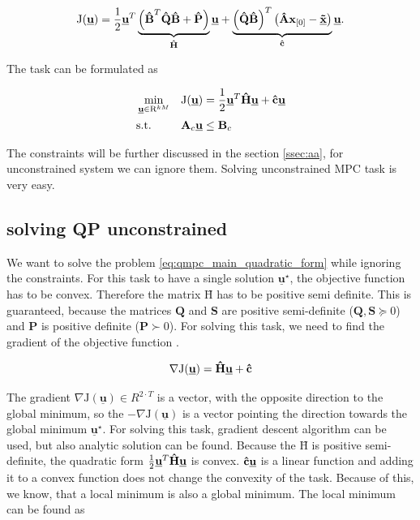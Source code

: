 \documentclass{article}
\newcommand{\uvec}{\textbf{\underline{u}}}
\newcommand{\macJ}{\mathrm{J}(\uvec)}
\begin{document}
\begin{equation}
\mathrm{J}(\underline{\textbf{u}}) = \frac{1}{2}\uvec^T\underbrace{\left(\textbf{\^B}^T\textbf{\^Q}\textbf{\^B} + \textbf{\^P}\right)}_{\textbf{\^H}}\uvec + \underbrace{\left(\textbf{\^Q}\textbf{\^B}\right)^T\left(\textbf{\^A}\textbf{x}_{[0]} - \textbf{\underline{\~x}}\right)}_{\textbf{\^c}}\uvec.
\label{eq:mpc_objective_large}
\end{equation}

The task can be formulated as

\begin{equation}
\label{eq:qmpc_main_quadratic_form}
\begin{aligned}
& \min_{\uvec \in \mathrm{R}^{kM}}
& & \mathrm{J}(\uvec) = \frac{1}{2}\uvec^T\textbf{\^H}\uvec + \textbf{\^c} \uvec\\
& \text{s.t.}
& & \textbf{A}_c \uvec \leq \textbf{B}_c
\end{aligned}
\end{equation}

The constraints will be further discussed in the section \ref{ssec:aa}, for unconstrained system we can ignore them. Solving unconstrained MPC task is very easy.

\subsection{solving QP unconstrained}
We want to solve the problem \ref{eq:qmpc_main_quadratic_form} while ignoring the constraints. For this task to have a single solution $\underline{\textbf{u}}^{\star}$, the objective function has to be convex. Therefore the matrix $\textbf{\^H}$ has to be positive semi definite. This is guaranteed, because the matrices  $\textbf{Q}$ and $\textbf{S}$ are positive semi-definite ($\textbf{Q}, \textbf{S} \succeq 0$) and $\textbf{P}$ is positive definite ($\textbf{P} \succ 0$). For solving this task, we need to find the gradient of the objective function \cite{zometa2012implementation}. 

\begin{equation}
\label{eq:J_grad}
\nabla\macJ = \textbf{\^H}\uvec + \textbf{\^c}
\end{equation}

The gradient $\nabla\mathrm{J}(\underline{\textbf{u}}) \in R^{2 \cdot T}$ is a vector, with the opposite direction to the global minimum, so the $-\nabla\mathrm{J}(\underline{\textbf{u}})$ is a vector pointing the direction towards the global minimum $\underline{\textbf{u}}^{\star}$. For solving this task, gradient descent algorithm can be used, but also analytic solution can be found.  
Because the  $\textbf{\^H}$ is positive semi-definite, the quadratic form $\frac{1}{2}\uvec^T\textbf{\^H}\uvec$ is convex. $\textbf{\^c} \uvec$ is a linear function and adding it to a convex function does not change the convexity of the task. Because of this, we know, that a local minimum is also a global minimum. The local minimum can be found as 
\end{document}
